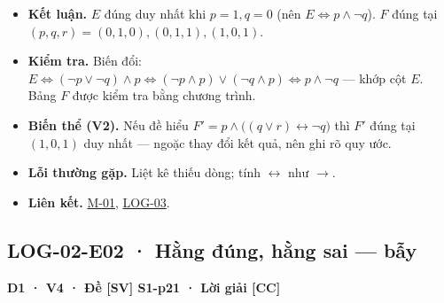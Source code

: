 \documentclass[
  10pt,
  twoside,openany]{book}
\providecommand{\tightlist}{%
  \setlength{\itemsep}{0pt}\setlength{\parskip}{0pt}}
\begin{document}
\begin{itemize}
\tightlist
\item
  \textbf{Kết luận.} \(E\) đúng duy nhất khi \(p=1,q=0\) (nên
  \(E\Leftrightarrow p\wedge\neg q\)). \(F\) đúng tại
  \((p,q,r)=(0,1,0),(0,1,1),(1,0,1)\).
\item
  \textbf{Kiểm tra.} Biến đổi:
  \(E\Leftrightarrow(\neg p\vee\neg q)\wedge p\Leftrightarrow(\neg p\wedge p)\vee(\neg q\wedge p)\Leftrightarrow p\wedge\neg q\)
  --- khớp cột \(E\). Bảng \(F\) được kiểm tra bằng chương trình.
\item
  \textbf{Biến thể (V2).} Nếu đề hiểu
  \(F'=p\wedge\big((q\vee r)\leftrightarrow\neg q\big)\) thì \(F'\) đúng
  tại \((1,0,1)\) duy nhất --- ngoặc thay đổi kết quả, nên ghi rõ quy
  ước.
\item
  \textbf{Lỗi thường gặp.} Liệt kê thiếu dòng; tính \(\leftrightarrow\)
  như \(\to\).
\item
  \textbf{Liên kết.} \protect\hyperlink{M-01}{M-01},
  \protect\hyperlink{LOG-03}{LOG-03}.
\end{itemize}

\hypertarget{LOG-02-E02}{%
\subsection{LOG-02-E02 · Hằng đúng, hằng sai --- bẫy}\label{LOG-02-E02}}

\textbf{D1 · V4 · Đề {[}SV{]} S1-p21 · Lời giải {[}CC{]}}
\end{document}
